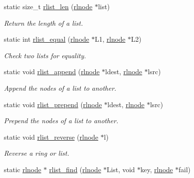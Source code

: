 \begin{DoxyCompactItemize}
static size\+\_\+t \hyperlink{group__rlists_ga107b2689c5811f7dbab8f334812b46d0}{rlist\+\_\+len} (\hyperlink{group__rlists_ga8f6244877f7ce2322c90525217ea6e7a}{rlnode} $\ast$list)
\begin{DoxyCompactList}\small\item\em Return the length of a list. \end{DoxyCompactList}\item 
static int \hyperlink{group__rlists_gac02a33ca2f63b5dc5e9597a54da32cf4}{rlist\+\_\+equal} (\hyperlink{group__rlists_ga8f6244877f7ce2322c90525217ea6e7a}{rlnode} $\ast$L1, \hyperlink{group__rlists_ga8f6244877f7ce2322c90525217ea6e7a}{rlnode} $\ast$L2)
\begin{DoxyCompactList}\small\item\em Check two lists for equality. \end{DoxyCompactList}\item 
static void \hyperlink{group__rlists_ga7f5989d7ec35645d6bbb1c15cd438532}{rlist\+\_\+append} (\hyperlink{group__rlists_ga8f6244877f7ce2322c90525217ea6e7a}{rlnode} $\ast$ldest, \hyperlink{group__rlists_ga8f6244877f7ce2322c90525217ea6e7a}{rlnode} $\ast$lsrc)
\begin{DoxyCompactList}\small\item\em Append the nodes of a list to another. \end{DoxyCompactList}\item 
static void \hyperlink{group__rlists_ga906dea2f5a25116f979ba6585266453e}{rlist\+\_\+prepend} (\hyperlink{group__rlists_ga8f6244877f7ce2322c90525217ea6e7a}{rlnode} $\ast$ldest, \hyperlink{group__rlists_ga8f6244877f7ce2322c90525217ea6e7a}{rlnode} $\ast$lsrc)
\begin{DoxyCompactList}\small\item\em Prepend the nodes of a list to another. \end{DoxyCompactList}\item 
static void \hyperlink{group__rlists_ga3911836f21f2f50b4caa2fa1d8e1f1de}{rlist\+\_\+reverse} (\hyperlink{group__rlists_ga8f6244877f7ce2322c90525217ea6e7a}{rlnode} $\ast$l)
\begin{DoxyCompactList}\small\item\em Reverse a ring or list. \end{DoxyCompactList}\item 
static \hyperlink{group__rlists_ga8f6244877f7ce2322c90525217ea6e7a}{rlnode} $\ast$ \hyperlink{group__rlists_gafbb3a5edeac9f1d43130528292c47cf6}{rlist\+\_\+find} (\hyperlink{group__rlists_ga8f6244877f7ce2322c90525217ea6e7a}{rlnode} $\ast$List, void $\ast$key, \hyperlink{group__rlists_ga8f6244877f7ce2322c90525217ea6e7a}{rlnode} $\ast$fail)

\end{DoxyCompactItemize}
